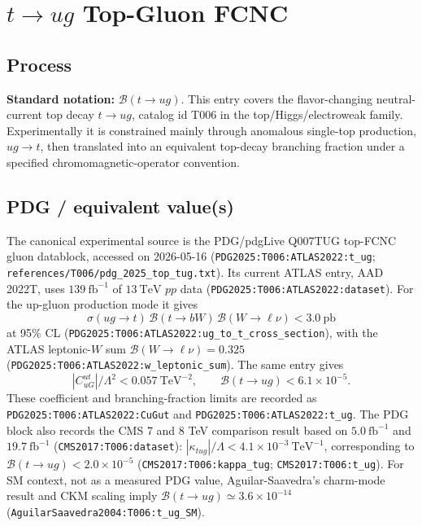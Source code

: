 
\section{\texorpdfstring{\(t\to u g\)}{t -> u g} Top-Gluon FCNC}

\subsection*{Process}
\textbf{Standard notation:} \(\mathcal{B}(t\to u g)\).
This entry covers the flavor-changing neutral-current top decay \(t\to u g\),
catalog id T006 in the top/Higgs/electroweak family.  Experimentally it is
constrained mainly through anomalous single-top production, \(u g\to t\), then
translated into an equivalent top-decay branching fraction under a specified
chromomagnetic-operator convention.

\subsection*{PDG / equivalent value(s)}
The canonical experimental source is the PDG/pdgLive Q007TUG top-FCNC gluon
datablock, accessed on 2026-05-16
(\texttt{PDG2025:T006:ATLAS2022:t\_ug};
\texttt{references/T006/pdg\_2025\_top\_tug.txt}).  Its current ATLAS entry,
AAD 2022T, uses \(139~\mathrm{fb}^{-1}\) of \(13~\mathrm{TeV}\) \(pp\) data
(\texttt{PDG2025:T006:ATLAS2022:dataset}).  For the up-gluon production mode
it gives
\[
  \sigma(ug\to t)\,\mathcal{B}(t\to bW)\,
  \mathcal{B}(W\to \ell\nu)<3.0~\mathrm{pb}
\]
at 95\% CL (\texttt{PDG2025:T006:ATLAS2022:ug\_to\_t\_cross\_section}), with
the ATLAS leptonic-\(W\) sum \(\mathcal{B}(W\to\ell\nu)=0.325\)
(\texttt{PDG2025:T006:ATLAS2022:w\_leptonic\_sum}).  The same entry gives
\[
  |C^{ut}_{uG}|/\Lambda^2 < 0.057~\mathrm{TeV}^{-2},
  \qquad
  \mathcal{B}(t\to u g)<6.1\times10^{-5}.
\]
These coefficient and branching-fraction limits are recorded as
\texttt{PDG2025:T006:ATLAS2022:CuGut} and
\texttt{PDG2025:T006:ATLAS2022:t\_ug}.
The PDG block also records the CMS 7 and 8 TeV comparison result based on
\(5.0~\mathrm{fb}^{-1}\) and \(19.7~\mathrm{fb}^{-1}\)
(\texttt{CMS2017:T006:dataset}):
\(|\kappa_{tug}|/\Lambda<4.1\times10^{-3}~\mathrm{TeV}^{-1}\), corresponding
to \(\mathcal{B}(t\to u g)<2.0\times10^{-5}\)
(\texttt{CMS2017:T006:kappa\_tug}; \texttt{CMS2017:T006:t\_ug}).  For SM
context, not as a measured PDG value, Aguilar-Saavedra's charm-mode result and
CKM scaling imply
\(\mathcal{B}(t\to u g)\simeq3.6\times10^{-14}\)
(\texttt{AguilarSaavedra2004:T006:t\_ug\_SM}).

